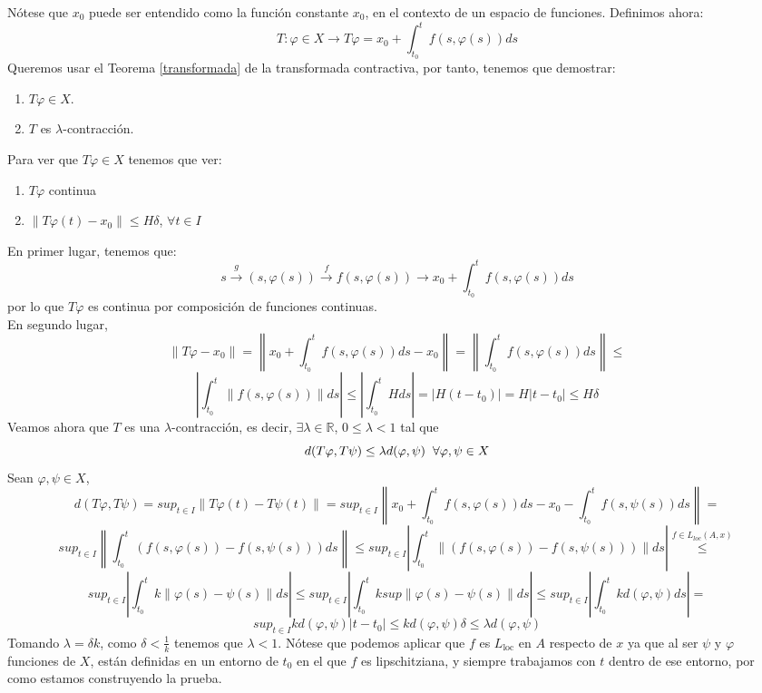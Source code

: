 \documentclass[11pt, a4paper,twoside]{article}
\makeatletter
\theoremstyle{theorem-style}  %
\renewenvironment{proof}[1][\proofname]{\par
	\pushQED{\qed}%
	\normalfont \topsep6\p@\@plus6\p@\relax
	\list{}{%
		\settowidth{\leftmargin}{\quad:\hskip\labelsep}%
		\setlength{\labelwidth}{0pt}%
		\setlength{\itemindent}{-\leftmargin}%
	}%
	\item[\hskip\labelsep\itshape#1\@addpunct{:}]\ignorespaces
}{%
	\popQED\endlist\@endpefalse
}
\theoremstyle{definition-style}
\theoremstyle{example-style}
\providecommand{\norm}[1]{\left\lVert#1\right\rVert} %
\providecommand{\abs}[1]{\left\lvert#1\right\rvert} %
\makeatother
\begin{document}
\begin{proof}
	Nótese que $ x_0 $ puede ser entendido como la función constante $ x_0 $, en el contexto de un espacio de funciones. Definimos ahora:
	\[T:\varphi \in X \longrightarrow T\varphi = x_0 + \int_{t_0}^{t} f(s, \varphi(s))ds\]
	Queremos usar el Teorema \ref{transformada} de la transformada contractiva, por tanto, tenemos que demostrar:
	\begin{enumerate}
		\item $T\varphi \in X$.
		\item $T$ es $\lambda$-contracción.
	\end{enumerate}
	Para ver que $T\varphi \in X$ tenemos que ver:
	\begin{enumerate}[	i.]
		\item $T\varphi$ continua
		\item $\norm{T\varphi (t) - x_0} \leq H\delta$, $\forall t \in I$
	\end{enumerate}
	En primer lugar, tenemos que:
	\[s \stackrel{g}{\longrightarrow} (s, \varphi (s)) \stackrel{f}{\longrightarrow} f(s, \varphi (s)) \longrightarrow x_0 + \int_{t_0}^{t}f(s,\varphi (s))ds  \]
	por lo que $T\varphi$ es continua por composición de funciones continuas. \\
	En segundo lugar, 
	\[\norm{T\varphi - x_0} = \norm{x_0 + \int_{t_0}^{t} f(s, \varphi (s)) ds - x_0} = \norm{\int_{t_0}^{t} f(s, \varphi (s)) ds} \leq \]
	\[\abs{\int_{t_0}^{t} \norm{f(s, \varphi (s))}ds} \leq \abs{\int_{t_0}^{t} H ds} = \abs{H(t - t_0)} = H\abs{t - t_0} \leq H\delta \]
	Veamos ahora que $T$ es una $\lambda$-contracción, es decir, $\exists \lambda \in \mathbb{R}$, $0 \leq \lambda < 1$ tal que
	\[d(T\varphi, T\psi) \leq \lambda d(\varphi, \psi) \hspace{0,2cm} \forall \varphi, \psi \in X\]
	Sean $\varphi, \psi \in X$, \\
	\[d(T\varphi, T\psi) = sup_{t \in I} \norm{T\varphi (t) - T\psi (t)} = sup_{t \in I} \norm{x_0 + \int_{t_0}^{t} f(s, \varphi(s))ds - x_0 - \int_{t_0}^{t} f(s, \psi(s))ds} = \]
	\[sup_{t \in I} \norm{\int_{t_0}^{t} (f(s, \varphi(s)) - f(s, \psi(s)))ds} \leq sup_{t \in I} \abs{\int_{t_0}^{t} \norm{(f(s, \varphi(s)) - f(s, \psi(s)))}ds} \stackrel{f \in L_{loc} (A, x)}{\leq} \] 
	\[sup_{t \in I} \abs{\int_{t_0}^{t} k\norm{\varphi(s) - \psi(s)}ds} \leq sup_{t \in I} \abs{\int_{t_0}^{t} k sup\norm{\varphi(s) - \psi(s)}ds} \leq sup_{t \in I} \abs{\int_{t_0}^{t} k d(\varphi, \psi)ds} = \]
	\[sup_{t \in I} kd(\varphi, \psi)\abs{t - t_0} \leq kd(\varphi, \psi)\delta \leq \lambda d(\varphi, \psi)\]
	Tomando $\lambda = \delta k$, como $\delta < \frac{1}{k}$ tenemos que $\lambda < 1$. Nótese que podemos aplicar que $ f $ es $ L_{\text{loc}} $ en $ A $ respecto de $ x $ ya que al ser $ \psi $ y $ \varphi $ funciones de $ X $, están definidas en un entorno de $ t_0 $ en el que $ f $ es lipschitziana, y siempre trabajamos con $ t $ dentro de ese entorno, por como estamos construyendo la prueba.
	

\end{proof}
\end{document}
